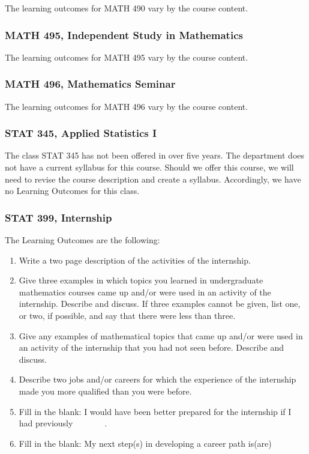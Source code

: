 \documentclass[11pt]{article}
\newenvironment{alphalist}{
\begin{enumerate}[label=(\arabic*),widest=107 ,leftmargin=25pt, itemsep=0pt]}
{\end{enumerate}}
\begin{document}
The learning outcomes for MATH 490 vary by the course content.

\subsubsection*{MATH 495, Independent Study in Mathematics}


The learning outcomes for MATH 495 vary by the course content.

\subsubsection*{MATH 496, Mathematics Seminar}

The learning outcomes for MATH 496 vary by the course content.


\subsubsection*{STAT 345, Applied Statistics I}

The class STAT 345 has not been offered in over five years.  The
department does not have a current syllabus for this course. Should we offer this course,  we will need to revise
the course description and create a syllabus. Accordingly, we have no Learning Outcomes for this class.


\subsubsection*{STAT 399, Internship}

The Learning Outcomes are the following:
\begin{alphalist}
    \item Write a two page description of the activities of the internship.
    \item Give three examples in which topics you learned in 
    undergraduate mathematics courses came up and/or were used in an activity of the internship. Describe and discuss. If three examples cannot be given, list one, or two, if possible, and say that there were less than three.
    \item Give any examples of mathematical topics that came up and/or were used in an activity of the internship that you had not seen before. Describe and discuss. 
    \item Describe two jobs and/or careers for which the experience of the internship made you more qualified than you were before.
    \item Fill in the blank: I would have been better prepared for the internship if I had previously \underline{$\phantom{xxxxxx}$}.
    \item Fill in the blank: My next step(s) in developing a career path is(are) \underline{$\phantom{xxxxxx}$}
\end{alphalist}
\end{document}
